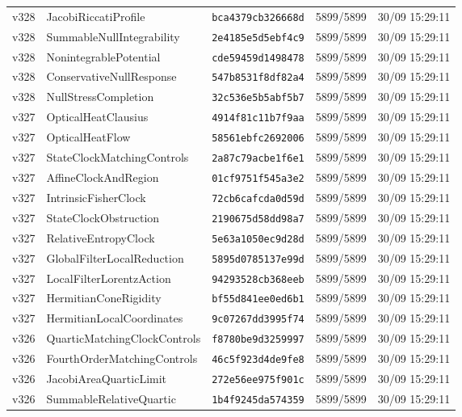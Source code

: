 \documentclass[11pt]{article}
\theoremstyle{definition}\newtheorem{deriv}{Derivation}
\begin{document}
{\begin{longtable}{@{}lllll@{}}
v328 & JacobiRiccatiProfile & \texttt{bca4379cb326668d} & 5899/5899 & 30/09 15:29:11 \\
v328 & SummableNullIntegrability & \texttt{2e4185e5d5ebf4c9} & 5899/5899 & 30/09 15:29:11 \\
v328 & NonintegrablePotential & \texttt{cde59459d1498478} & 5899/5899 & 30/09 15:29:11 \\
v328 & ConservativeNullResponse & \texttt{547b8531f8df82a4} & 5899/5899 & 30/09 15:29:11 \\
v328 & NullStressCompletion & \texttt{32c536e5b5abf5b7} & 5899/5899 & 30/09 15:29:11 \\
v327 & OpticalHeatClausius & \texttt{4914f81c11b7f9aa} & 5899/5899 & 30/09 15:29:11 \\
v327 & OpticalHeatFlow & \texttt{58561ebfc2692006} & 5899/5899 & 30/09 15:29:11 \\
v327 & StateClockMatchingControls & \texttt{2a87c79acbe1f6e1} & 5899/5899 & 30/09 15:29:11 \\
v327 & AffineClockAndRegion & \texttt{01cf9751f545a3e2} & 5899/5899 & 30/09 15:29:11 \\
v327 & IntrinsicFisherClock & \texttt{72cb6cafcda0d59d} & 5899/5899 & 30/09 15:29:11 \\
v327 & StateClockObstruction & \texttt{2190675d58dd98a7} & 5899/5899 & 30/09 15:29:11 \\
v327 & RelativeEntropyClock & \texttt{5e63a1050ec9d28d} & 5899/5899 & 30/09 15:29:11 \\
v327 & GlobalFilterLocalReduction & \texttt{5895d0785137e99d} & 5899/5899 & 30/09 15:29:11 \\
v327 & LocalFilterLorentzAction & \texttt{94293528cb368eeb} & 5899/5899 & 30/09 15:29:11 \\
v327 & HermitianConeRigidity & \texttt{bf55d841ee0ed6b1} & 5899/5899 & 30/09 15:29:11 \\
v327 & HermitianLocalCoordinates & \texttt{9c07267dd3995f74} & 5899/5899 & 30/09 15:29:11 \\
v326 & QuarticMatchingClockControls & \texttt{f8780be9d3259997} & 5899/5899 & 30/09 15:29:11 \\
v326 & FourthOrderMatchingControls & \texttt{46c5f923d4de9fe8} & 5899/5899 & 30/09 15:29:11 \\
v326 & JacobiAreaQuarticLimit & \texttt{272e56ee975f901c} & 5899/5899 & 30/09 15:29:11 \\
v326 & SummableRelativeQuartic & \texttt{1b4f9245da574359} & 5899/5899 & 30/09 15:29:11 \\

\end{longtable}}
\end{document}
